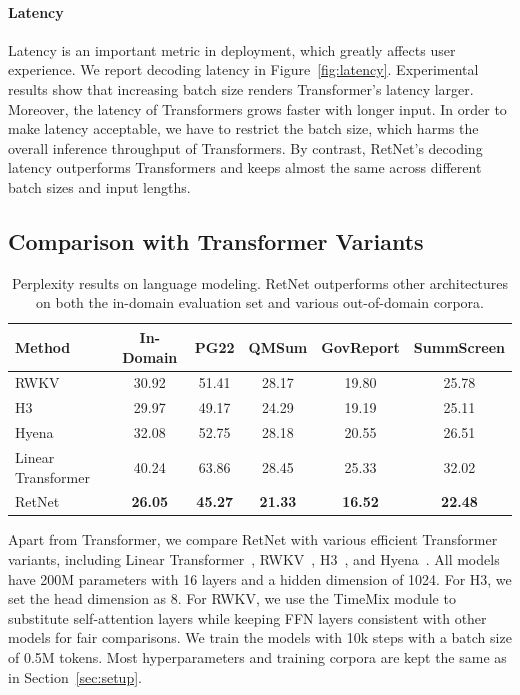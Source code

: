 \documentclass{article}
\newcommand\our{RetNet}
\begin{document}
\paragraph{Latency}
Latency is an important metric in deployment, which greatly affects user experience.
We report decoding latency in Figure~\ref{fig:latency}.
Experimental results show that increasing batch size renders Transformer's latency larger.
Moreover, the latency of Transformers grows faster with longer input.
In order to make latency acceptable, we have to restrict the batch size, which harms the overall inference throughput of Transformers.
By contrast, \our{}'s decoding latency outperforms Transformers and keeps almost the same across different batch sizes and input lengths.


\subsection{Comparison with Transformer Variants}
\label{sec:competitor}

\begin{table}[t]
\centering
\begin{tabular}{lc|cccc}
\toprule
\textbf{Method}    & \textbf{In-Domain}      &  \textbf{PG22}   &   \textbf{QMSum}    & \textbf{GovReport} & \textbf{SummScreen}\\
\midrule
RWKV & 30.92 & 51.41 & 28.17 & 19.80 & 25.78 \\
H3 & 29.97 & 49.17 & 24.29 & 19.19 & 25.11 \\
Hyena & 32.08 & 52.75 & 28.18 & 20.55 & 26.51 \\
Linear Transformer & 40.24 & 63.86 & 28.45 & 25.33 & 32.02 \\
\our{} & \textbf{26.05} & \textbf{45.27} & \textbf{21.33} & \textbf{16.52} & \textbf{22.48} \\
\bottomrule
\end{tabular}
\caption{Perplexity results on language modeling. \our{} outperforms other architectures on both the in-domain evaluation set and various out-of-domain corpora.}
\label{tbl:competitor}
\end{table}

Apart from Transformer, we compare \our{} with various efficient Transformer variants, including Linear Transformer~\cite{linear-transformer}, RWKV~\cite{rwkv}, H3~\cite{h3}, and Hyena~\cite{hyena}.
All models have 200M parameters with 16 layers and a hidden dimension of 1024.
For H3, we set the head dimension as 8.
For RWKV, we use the TimeMix module to substitute self-attention layers while keeping FFN layers consistent with other models for fair comparisons.
We train the models with 10k steps with a batch size of 0.5M tokens.
Most hyperparameters and training corpora are kept the same as in Section~\ref{sec:setup}.
\end{document}
